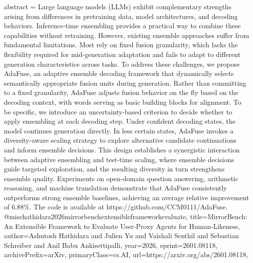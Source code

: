 {      abstract = {Large language models (LLMs) exhibit complementary strengths arising from differences in pretraining data, model architectures, and decoding behaviors. Inference-time ensembling provides a practical way to combine these capabilities without retraining. However, existing ensemble approaches suffer from fundamental limitations. Most rely on fixed fusion granularity, which lacks the flexibility required for mid-generation adaptation and fails to adapt to different generation characteristics across tasks. To address these challenges, we propose AdaFuse, an adaptive ensemble decoding framework that dynamically selects semantically appropriate fusion units during generation. Rather than committing to a fixed granularity, AdaFuse adjusts fusion behavior on the fly based on the decoding context, with words serving as basic building blocks for alignment. To be specific, we introduce an uncertainty-based criterion to decide whether to apply ensembling at each decoding step. Under confident decoding states, the model continues generation directly. In less certain states, AdaFuse invokes a diversity-aware scaling strategy to explore alternative candidate continuations and inform ensemble decisions. This design establishes a synergistic interaction between adaptive ensembling and test-time scaling, where ensemble decisions guide targeted exploration, and the resulting diversity in turn strengthens ensemble quality. Experiments on open-domain question answering, arithmetic reasoning, and machine translation demonstrate that AdaFuse consistently outperforms strong ensemble baselines, achieving an average relative improvement of 6.88\%. The code is available at https://github.com/CCM0111/AdaFuse.}
}@misc{hathidara2026mirrorbenchextensibleframeworkevaluate,
      title={MirrorBench: An Extensible Framework to Evaluate User-Proxy Agents for Human-Likeness}, 
      author={Ashutosh Hathidara and Julien Yu and Vaishali Senthil and Sebastian Schreiber and Anil Babu Ankisettipalli},
      year={2026},
      eprint={2601.08118},
      archivePrefix={arXiv},
      primaryClass={cs.AI},
      url={https://arxiv.org/abs/2601.08118},
}
